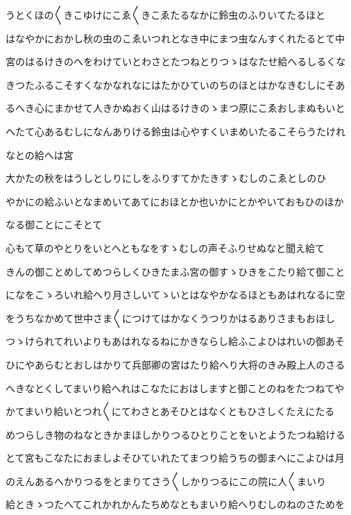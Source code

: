 \documentclass[a4paper,11pt,landscape]{ltjtarticle}
\begin{document}
\par\medskip
うとくほの〱きこゆけにこゑ〱きこゑたるなかに鈴虫のふりいてたるほと
\par\medskip
はなやかにおかし秋の虫のこゑいつれとなき中にまつ虫なんすくれたるとて中
\par\medskip
宮のはるけきのへをわけていとわさとたつねとりつゝはなたせ給へるしるくな
\par\medskip
きつたふるこそすくなかなれなにはたかひていのちのほとはかなきむしにそあ
\par\medskip
るへき心にまかせて人きかぬおく山はるけきのゝまつ原にこゑおしまぬもいと
\par\medskip
へたて心あるむしになんありける鈴虫は心やすくいまめいたるこそらうたけれ
\par\medskip
なとの給へは宮
\par\medskip
大かたの秋をはうしとしりにしをふりすてかたきすゝむしのこゑとしのひ
\par\medskip
やかにの給ふいとなまめいてあてにおほとか也いかにとかやいておもひのほか
\par\medskip
なる御ことにこそとて
\par\medskip
心もて草のやとりをいとへともなをすゝむしの声そふりせぬなと聞え給て
\par\medskip
きんの御ことめしてめつらしくひきたまふ宮の御すゝひきをこたり給て御こと
\par\medskip
になをこゝろいれ給へり月さしいてゝいとはなやかなるほともあはれなるに空
\par\medskip
をうちなかめて世中さま〱につけてはかなくうつりかはるありさまもおほし
\par\medskip
つゝけられてれいよりもあはれなるねにかきならし給ふこよひはれいの御あそ
\par\medskip
ひにやあらむとおしはかりて兵部卿の宮はたり給へり大将のきみ殿上人のさる
\par\medskip
へきなとくしてまいり給へれはこなたにおはしますと御ことのねをたつねてや
\par\medskip
かてまいり給いとつれ〱にてわさとあそひとはなくともひさしくたえにたる
\par\medskip
めつらしき物のねなときかまほしかりつるひとりことをいとようたつね給ける
\par\medskip
とて宮もこなたにおましよそひていれたてまつり給うちの御まへにこよひは月
\par\medskip
のえんあるへかりつるをとまりてさう〱しかりつるにこの院に人〱まいり
\par\medskip
給ときゝつたへてこれかれかんたちめなともまいり給へりむしのねのさためを
\end{document}
